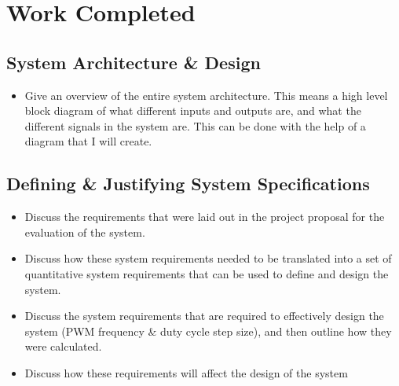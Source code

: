 \chapter{Work Completed}\label{C:work}

\section{System Architecture \& Design}\label{S:system}

\begin{itemize}
    
    \begin{figure}[H]
        \texttt{[image: System\_Overview.png]}
        \caption{High level system overview}
        \label{F:sys_overview}
    \end{figure}

    \item 
    Give an overview of the entire system architecture. This means a high level block diagram of what different inputs and outputs are, and what the different signals in the system are. This can be done with the help of a diagram that I will create. 
    

\end{itemize}

\section{Defining \& Justifying System Specifications}\label{S:specs}

\begin{itemize}

    \item 
    Discuss the requirements that were laid out in the project proposal for the evaluation of the system. 

    \item 
    Discuss how these system requirements needed to be translated into a set of quantitative system requirements that can be used to define and design the system.
    
    \item 
    Discuss the system requirements that are required to effectively design the system (PWM frequency \& duty cycle step size), and then outline how they were calculated.
    
    \item 
    Discuss how these requirements will affect the design of the system

\end{itemize}

